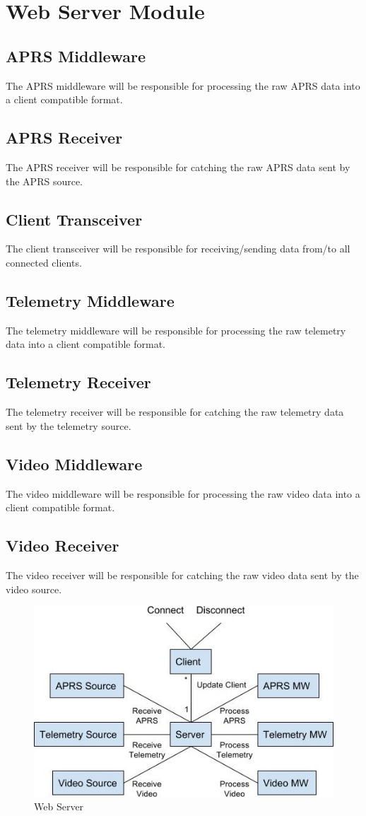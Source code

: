 \section{Web Server Module}

\subsection{APRS Middleware}
The APRS middleware will be responsible for processing the raw APRS data into a client compatible format.

\subsection{APRS Receiver}
The APRS receiver will be responsible for catching the raw APRS data sent by the APRS source.

\subsection{Client Transceiver}
The client transceiver will be responsible for receiving/sending data from/to all connected clients.

\subsection{Telemetry Middleware}
The telemetry middleware will be responsible for processing the raw telemetry data into a client compatible format.

\subsection{Telemetry Receiver}
The telemetry receiver will be responsible for catching the raw telemetry data sent by the telemetry source.

\subsection{Video Middleware}
The video middleware will be responsible for processing the raw video data into a client compatible format.

\subsection{Video Receiver}
The video receiver will be responsible for catching the raw video data sent by the video source.

\begin{figure}[!ht]
  \centering
  \includegraphics[scale=.8]{imgs/web_server.jpg}
  \caption{Web Server}
\end{figure}
